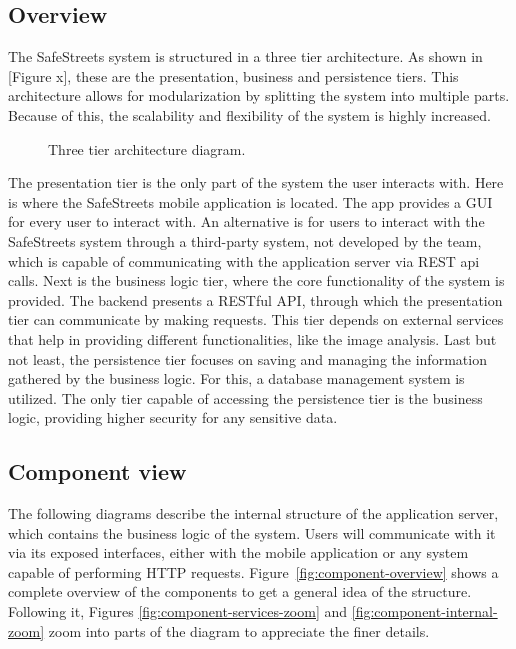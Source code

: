 \subsection{Overview}

The SafeStreets system is structured in a three tier architecture. As shown in [Figure x], these are the presentation, business and persistence tiers. This architecture allows for modularization by splitting the system into multiple parts. Because of this, the scalability and flexibility of the system is highly increased.

\begin{figure}[H]
\centering
{}
\caption{\label{fig:3-tiers}Three tier architecture diagram.}
\end{figure}

The presentation tier is the only part of the system the user interacts with. Here is where the SafeStreets mobile application is located. The app provides a GUI for every user to interact with.
An alternative is for users to interact with the SafeStreets system through a third-party system, not developed by the team, which is capable of communicating with the application server via REST api calls.
Next is the business logic tier, where the core functionality of the system is provided. The backend presents a RESTful API, through which the presentation tier can communicate by making requests. This tier depends on external services that help in providing different functionalities, like the image analysis.
Last but not least, the persistence tier focuses on saving and managing the information gathered by the business logic. For this, a database management system is utilized. The only tier capable of accessing the persistence tier is the business logic, providing higher security for any sensitive data.


\subsection{Component view} \label{sub-sect:component-view}
The following diagrams describe the internal structure of the application server, which contains the business logic of the system. Users will communicate with it via its exposed interfaces, either with the mobile application or any system capable of performing HTTP requests.
Figure~\ref{fig:component-overview} shows a complete overview of the components to get a general idea of the structure. Following it, Figures \ref{fig:component-services-zoom} and \ref{fig:component-internal-zoom} zoom into parts of the diagram to appreciate the finer details.

